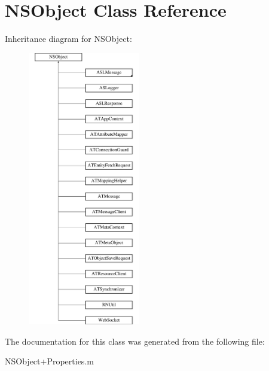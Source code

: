 \hypertarget{class_n_s_object}{
\section{NSObject Class Reference}
\label{class_n_s_object}
}
Inheritance diagram for NSObject:\begin{figure}[h]
\begin{center}
\leavevmode
\includegraphics[height=12.000000cm]{class_n_s_object}
\end{center}
\end{figure}


The documentation for this class was generated from the following file:\begin{DoxyCompactItemize}
\item 
NSObject+Properties.m\end{DoxyCompactItemize}
